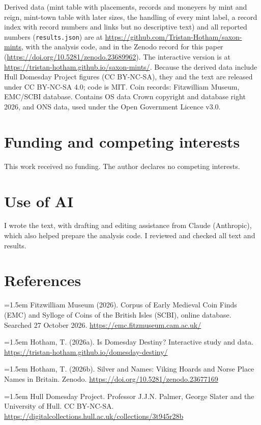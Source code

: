 \documentclass[11pt,a4paper]{article}
\begin{document}
Derived data (mint table with placements, records and moneyers by mint and reign, mint-town table with later sizes, the handling of every mint label, a record index with record numbers and links but no descriptive text) and all reported numbers (\texttt{results.json}) are at \url{https://github.com/Tristan-Hotham/saxon-mints}, with the analysis code, and in the Zenodo record for this paper (\url{https://doi.org/10.5281/zenodo.23689962}). The interactive version is at \url{https://tristan-hotham.github.io/saxon-mints/}. Because the derived data include Hull Domesday Project figures (CC BY-NC-SA), they and the text are released under CC BY-NC-SA 4.0; code is MIT. Coin records: Fitzwilliam Museum, EMC/SCBI database. Contains OS data \textcopyright{} Crown copyright and database right 2026, and ONS data, used under the Open Government Licence v3.0.

\section*{Funding and competing interests}

This work received no funding. The author declares no competing interests.

\section*{Use of AI}

I wrote the text, with drafting and editing assistance from Claude (Anthropic), which also helped prepare the analysis code. I reviewed and checked all text and results.

\section*{References}
\small
\setlength{\parskip}{0.35em}
\hangindent=1.5em Fitzwilliam Museum (2026). Corpus of Early Medieval Coin Finds (EMC) and Sylloge of Coins of the British Isles (SCBI), online database. Searched 27 October 2026. \url{https://emc.fitzmuseum.cam.ac.uk/}

\hangindent=1.5em Hotham, T. (2026a). Is Domesday Destiny? Interactive study and data. \url{https://tristan-hotham.github.io/domesday-destiny/}

\hangindent=1.5em Hotham, T. (2026b). Silver and Names: Viking Hoards and Norse Place Names in Britain. Zenodo. \url{https://doi.org/10.5281/zenodo.23677169}

\hangindent=1.5em Hull Domesday Project. Professor J.J.N. Palmer, George Slater and the University of Hull. CC BY-NC-SA. \url{https://digitalcollections.hull.ac.uk/collections/3t945r28b}
\end{document}
